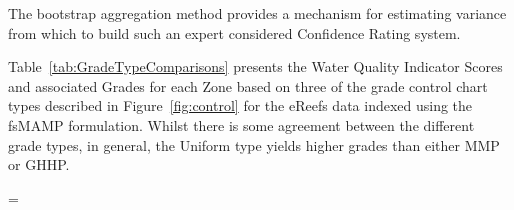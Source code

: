 The bootstrap aggregation method provides a mechanism for estimating variance from which to build
such an expert considered Confidence Rating system.
  

Table~\ref{tab:GradeTypeComparisons} presents the Water Quality Indicator Scores and associated
Grades for each Zone based on three of the grade control chart types described in
Figure~\ref{fig:control} for the eReefs data indexed using the fsMAMP formulation.  Whilst there is
some agreement between the different grade types, in general, the Uniform type yields higher grades
than either MMP or GHHP.

%                                 

\LTcapwidth=\linewidth
\setlength\aboverulesep{0pt}\setlength\belowrulesep{0pt}
\setlength\cmidrulekern{1pt}\setlength\cmidrulewidth{1pt}
\renewcommand\arraystretch{1.2}\setlength\tabcolsep{5pt}

